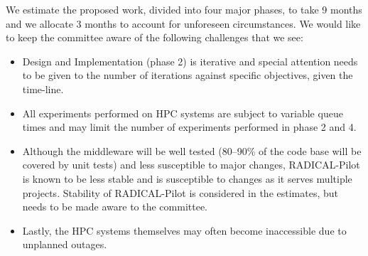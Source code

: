 We estimate the proposed work, divided into four major phases, to take 9 months 
and we allocate 3 months to account for unforeseen circumstances. We would like 
to keep the committee aware of the following challenges that we see:

\begin{itemize}
	\item Design and Implementation (phase 2) is iterative and special 
	attention needs to be given to the number of iterations against specific 
	objectives, given the time-line.
	\item All experiments performed on HPC systems are subject to variable 
	queue times and may limit the number of experiments performed in phase 2 
	and 4.
	\item Although the middleware will be well tested (80--90\% of the code 
	base will be covered by unit tests) and less susceptible to major 	
	changes, RADICAL-Pilot is known to be less stable and is susceptible to 
	changes as it serves multiple projects. Stability of RADICAL-Pilot is 
	considered in the estimates, but needs to be made aware to the committee.
	\item Lastly, the HPC systems themselves may often become inaccessible due 
	to unplanned outages.
\end{itemize}




